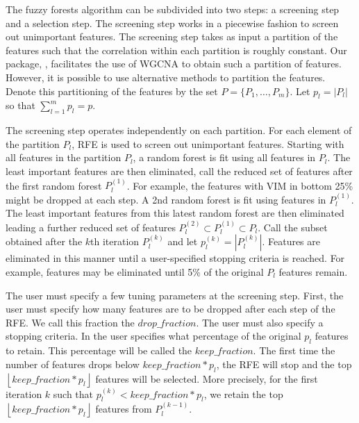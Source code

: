 \documentclass[article,shortnames]{jss}
\begin{document}
The fuzzy forests algorithm can be subdivided into two steps: a screening step and a selection step.  The screening step works in a piecewise fashion
to screen out unimportant features.  The screening step takes as input a partition of the features such that the correlation within each partition is 
roughly constant.  Our package, , facilitates the use of WGCNA to obtain such a partition of features.  However, 
it is possible to use alternative methods to partition the features.  Denote this partitioning of the features by the set $P=\{P_{1},\ldots,P_{m}\}$.
Let $p_{l}=|P_{l}|$ so that $\sum_{l=1}^{m}p_{l}=p$.

The screening step operates independently on each partition.  For each element of the partition $P_{l}$, RFE
is used to screen out unimportant features.  Starting with all features in the partition $P_{l}$, a random forest is fit using all
features in $P_{l}$.  The least important features are then eliminated, call the reduced set of features after the first random forest $P_{l}^{(1)}$.  
For example, the features with VIM in bottom 25\% might be dropped at each step. 
A 2nd random forest is fit using features in $P_{l}^{(1)}$.  The least important features from this latest random forest are then eliminated leading a
further reduced set of features $P_{l}^{(2)} \subset P_{l}^{(1)} \subset P_{l}$.  Call the subset obtained after the $k$th iteration $P_{l}^{(k)}$ and let
$p^{(k)}_{l}=|P_{l}^{(k)}|$.
Features are eliminated in this manner until a user-specified 
stopping criteria is reached.  For example, features may be eliminated until 5\% of the original $P_{l}$ features remain.  

The user must specify a few tuning parameters at the screening step.  First, the user must specify how many features are to be dropped after 
each step of the RFE.  We call this fraction the $drop\_fraction$.   The user must also specify a stopping criteria. 
In  the user specifies what percentage of the original $p_{l}$ features to retain.  This percentage will be called the $keep\_fraction$.  
The first time the number of features drops below $keep\_fraction*p_{l}$, the RFE will stop and the top 
$\left\lfloor keep\_fraction*p_{l} \right\rfloor$ features will be selected.  More precisely, for the first iteration $k$ such that $p^{(k)}_{l}<keep\_fraction*p_{l}$, 
we retain the top $\left\lfloor keep\_fraction*p_{l} \right\rfloor$ features from $P_{l}^{(k-1)}$.         
\end{document}
